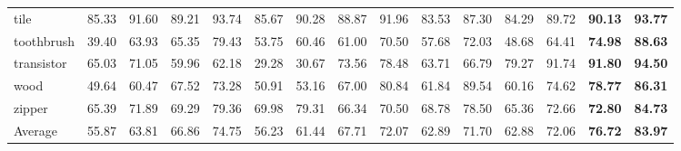 {\begin{tabular}{l|cc|cc|cc|cc|cc|cc|cc}
tile & 85.33 & 91.60 & 89.21 & 93.74 & 85.67 & 90.28 & 88.87 & 91.96 & 83.53 & 87.30 & 84.29 & 89.72 &\textbf{90.13} &\textbf{93.77} \\
toothbrush & 39.40 & 63.93 & 65.35 & 79.43 & 53.75 & 60.46 & 61.00 & 70.50 & 57.68 & 72.03 & 48.68 & 64.41 &\textbf{74.98} &\textbf{88.63} \\
transistor & 65.03 & 71.05 & 59.96 & 62.18 & 29.28 & 30.67 & 73.56 & 78.48 & 63.71 & 66.79 & 79.27 & 91.74 &\textbf{91.80} &\textbf{94.50} \\
wood & 49.64 & 60.47 & 67.52 & 73.28 & 50.91 & 53.16 & 67.00 & 80.84 & 61.84 & 89.54 & 60.16 & 74.62 &\textbf{78.77} &\textbf{86.31} \\
zipper & 65.39 & 71.89 & 69.29 & 79.36 & 69.98 & 79.31 & 66.34 & 70.50 & 68.78 & 78.50 & 65.36 & 72.66 &\textbf{72.80} &\textbf{84.73} \\ \hline
Average
& 55.87 & 63.81
& 66.86 & 74.75
& 56.23 & 61.44
& 67.71 & 72.07
& 62.89 & 71.70
& 62.88 & 72.06
&\textbf{76.72} &\textbf{83.97} \\ \hline
\end{tabular}
}

  
  \vskip -0.1in
  
